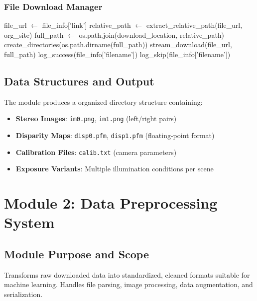 \documentclass[12pt]{article}
\begin{document}
\subsubsection{File Download Manager}
\begin{algorithm}[H]
\caption{Robust File Download}
\begin{algorithmic}[1]
\State {}
    \State file\_url $\gets$ file\_info['link']
    \State relative\_path $\gets$ extract\_relative\_path(file\_url, org\_site)
    \State full\_path $\gets$ os.path.join(download\_location, relative\_path)
    \State {}
        \State create\_directories(os.path.dirname(full\_path))
        \State stream\_download(file\_url, full\_path)
        \State log\_success(file\_info['filename'])
    \Else
        \State log\_skip(file\_info['filename'])
    \EndIf
\EndFor
\EndFunction
\end{algorithmic}
\end{algorithm}

\subsection{Data Structures and Output}

The module produces a organized directory structure containing:
\begin{itemize}[leftmargin=*]
\item \textbf{Stereo Images}: \texttt{im0.png}, \texttt{im1.png} (left/right pairs)
\item \textbf{Disparity Maps}: \texttt{disp0.pfm}, \texttt{disp1.pfm} (floating-point format)
\item \textbf{Calibration Files}: \texttt{calib.txt} (camera parameters)
\item \textbf{Exposure Variants}: Multiple illumination conditions per scene
\end{itemize}

\section{Module 2: Data Preprocessing System}

\subsection{Module Purpose and Scope}
Transforms raw downloaded data into standardized, cleaned formats suitable for machine learning. Handles file parsing, image processing, data augmentation, and serialization.
\end{document}
